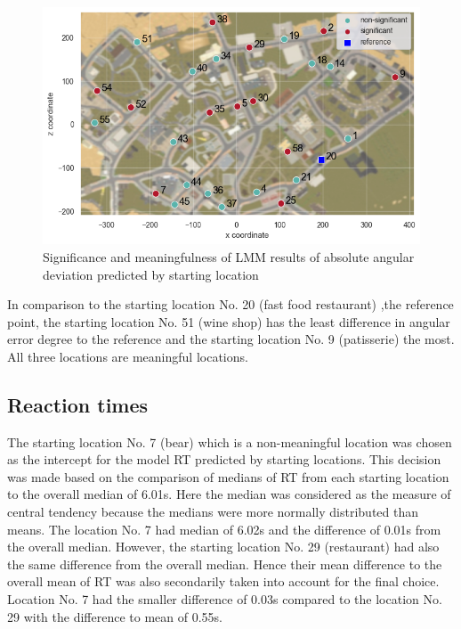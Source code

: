 \begin{figure}[!htb]
	\centering
	\includegraphics[width=150mm]{figures/significance_starting_locations_angular_error_map_23.png}
	\caption[Significance and meaningfulness (absolute angular deviation predicted by starting location)]{Significance and meaningfulness of LMM results of absolute angular deviation predicted by starting location}
	\label{fig:sig_angle_loc_map}
\end{figure}

In comparison to the starting location No. 20 (fast food restaurant) ,the reference point, the starting location No. 51 (wine shop) has the least difference in angular error degree to the reference and the starting location No. 9 (patisserie) the most. All three locations are meaningful locations.

\subsection{Reaction times}

The starting location No. 7 (bear) which is a non-meaningful location was chosen as the intercept for the model RT predicted by starting locations. This decision was made based on the comparison of medians of RT from each starting location to the overall median of 6.01s. Here the median was considered as the measure of central tendency because the medians were more normally distributed than means. The location No. 7 had median of 6.02s and the difference of 0.01s from the overall median. However, the starting location No. 29 (restaurant) had also the same difference from the overall median. Hence their mean difference to the overall mean of RT was also secondarily taken into account for the final choice. Location No. 7 had the smaller difference of 0.03s compared to the location No. 29 with the difference to mean of 0.55s. 

